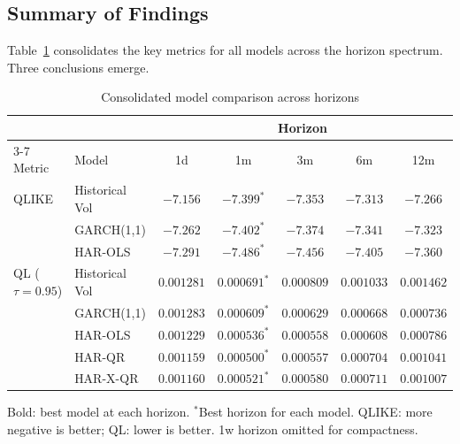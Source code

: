 \subsection{Summary of Findings}
\label{sec:res-summary}

Table~\ref{tab:model-summary} consolidates the key metrics for all models
across the horizon spectrum. Three conclusions emerge.

\begin{table}[htbp]
\centering
\small
\caption{Consolidated model comparison across horizons}
\label{tab:model-summary}
\setlength{\tabcolsep}{4.5pt}
\begin{tabular}{llccccc}
\toprule
 & & \multicolumn{5}{c}{Horizon} \\
\cmidrule(lr){3-7}
Metric & Model & 1d & 1m & 3m & 6m & 12m \\
\midrule
QLIKE & Historical Vol & $-7.156$ & $-7.399^{*}$ & $-7.353$ & $-7.313$ & $-7.266$ \\
      & GARCH(1,1)     & $-7.262$ & $-7.402^{*}$ & $-7.374$ & $-7.341$ & $-7.323$ \\
      & HAR-OLS        & $\mathbf{-7.291}$ & $\mathbf{-7.486}^{*}$ & $\mathbf{-7.456}$ & $\mathbf{-7.405}$ & $\mathbf{-7.360}$ \\
\addlinespace
QL ($\tau\!=\!0.95$) & Historical Vol & $0.001281$ & $0.000691^{*}$ & $0.000809$ & $0.001033$ & $0.001462$ \\
      & GARCH(1,1)     & $0.001283$ & $0.000609^{*}$ & $0.000629$ & $0.000668$ & $\mathbf{0.000736}$ \\
      & HAR-OLS        & $0.001229$ & $0.000536^{*}$ & $0.000558$ & $\mathbf{0.000608}$ & $0.000786$ \\
      & HAR-QR         & $\mathbf{0.001159}$ & $\mathbf{0.000500}^{*}$ & $\mathbf{0.000557}$ & $0.000704$ & $0.001041$ \\
      & HAR-X-QR       & $0.001160$ & $0.000521^{*}$ & $0.000580$ & $0.000711$ & $0.001007$ \\
\bottomrule
\end{tabular}
\par\smallskip
{\footnotesize Bold: best model at each horizon. $^{*}$Best horizon for each model. QLIKE: more negative is better; QL: lower is better. 1w horizon omitted for compactness.}
\end{table}


